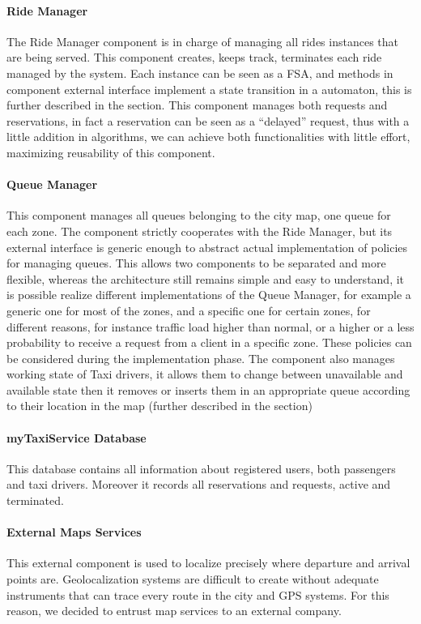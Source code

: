 \paragraph{Ride Manager}
The Ride Manager component is in charge of managing all rides instances that are being served. This component creates, keeps track, terminates each ride managed by the system. Each instance can be seen as a FSA, and methods in component external interface implement a state transition in a automaton, this is further described in the  section. \newline
This component manages both requests and reservations, in fact a reservation can be seen as a ``delayed'' request, thus with a little addition in algorithms, we can achieve both functionalities with little effort, maximizing reusability of this component.
\paragraph{Queue Manager}
This component manages all queues belonging to the city map, one queue for each zone. The component strictly cooperates with the Ride Manager, but its external interface is generic enough to abstract actual implementation of policies for managing queues. This allows two components to be separated and more flexible, whereas the architecture still remains simple and easy to understand, it is possible realize different implementations of the Queue Manager, for example a generic one for most of the zones, and a specific one for certain zones, for different reasons, for instance traffic load higher than normal, or a higher or a less probability to receive a request from a client in a specific zone. These policies can be considered during the implementation phase. \newline
The component also manages working state of Taxi drivers, it allows them to change between unavailable and available state then it removes or inserts them in an appropriate queue according to their location in the map (further described in the  section)
\paragraph{myTaxiService Database}
This database contains all information about registered users, both passengers and taxi drivers. Moreover it records all reservations and requests, active and terminated.
\paragraph{External Maps Services}
This external component is used to localize precisely where departure and arrival points are. Geolocalization systems are difficult to create without adequate instruments that can trace every route in the city and GPS systems. For this reason, we decided to entrust map services to an external company.
